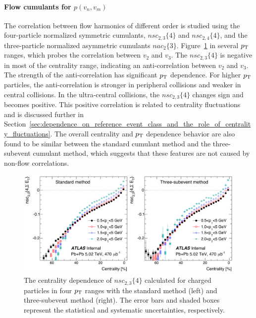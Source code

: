 \paragraph{Flow cumulants for $p(v_n, v_m)$}
\label{sec:flow_cumulants_for_pvnvm}

The correlation between flow harmonics of different order is studied using the four-particle normalized symmetric cumulants, $nsc_{2,3}\{4\}$ and $nsc_{2,4}\{4\}$, and the three-particle normalized asymmetric cumulants $nac_2\{3\}$. Figure~\ref{fig:centfluc_ATLAS_nsc23} in several $p_\text{T}$ ranges, which probes the correlation between $v_2$ and $v_3$. The $nsc_{2,3}\{4\}$ is negative in most of the centrality range, indicating an anti-correlation between $v_2$ and $v_3$. The strength of the anti-correlation has significant $p_\text{T}$ dependence. For higher $p_\text{T}$ particles, the anti-correlation is stronger in peripheral collisions and weaker in central collisions. In the ultra-central collisions, the $nsc_{2,3}\{4\}$ changes sign and becomes positive. This positive correlation is related to centrality fluctuations and is discussed further in Section~\ref{sec:dependence_on_reference_event_class_and_the_role_of_centrality_fluctuations}. The overall centrality and $p_\text{T}$ dependence behavior are also found to be similar between the standard cumulant method and the three-subevent cumulant method, which suggests that these features are not caused by non-flow correlations.

\begin{figure}[H]
\centering
\includegraphics[width=.95\linewidth]{figs/chapter_centfluc/ATLAS_nsc23.png}
\caption{The centrality dependence of $nsc_{2,3}\{4\}$ calculated for charged particles in four $p_\text{T}$ ranges with the standard method (left) and three-subevent method (right). The error bars and shaded boxes represent the statistical and systematic uncertainties, respectively.}
\label{fig:centfluc_ATLAS_nsc23}
\end{figure}

